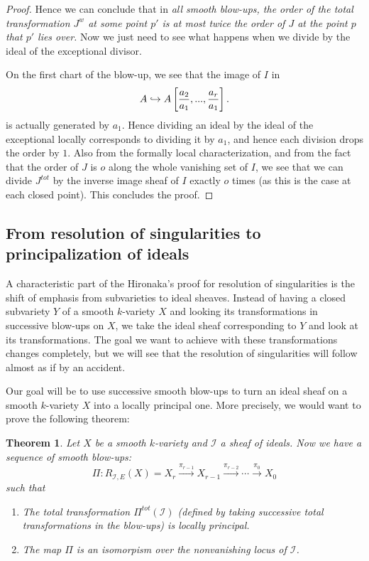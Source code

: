 \documentclass[12pt,a4paper,leqno]{article}
\theoremstyle{plain}
\newtheorem{thm}[theo]{Theorem}
\theoremstyle{definition}
\theoremstyle{remark}
\begin{document}
\begin{proof}
Hence we can conclude that in \emph{all smooth blow-ups, the order of the total transformation $J^w$ at some point $p'$ is at most twice the order of $J$ at the point $p$ that $p'$ lies over.} Now we just need to see what happens when we divide by the ideal of the exceptional divisor.

On the first chart of the blow-up, we see that the image of $I$ in
\begin{equation*}
A \hookrightarrow A \left[ {a_2 \over a_1}, ... , {a_r \over a_1} \right].
\end{equation*}
is actually generated by $a_1$. Hence dividing an ideal by the ideal of the exceptional locally corresponds to dividing it by $a_1$, and hence each division drops the order by $1$. Also from the formally local characterization, and from the fact that the order of $J$ is $o$ along the whole vanishing set of $I$, we see that we can divide $J^{tot}$ by the inverse image sheaf of $I$ exactly $o$ times (as this is the case at each closed point). This concludes the proof.  
\end{proof} 
 
\subsection{From resolution of singularities to principalization of ideals} 

A characteristic part of the Hironaka's proof for resolution of singularities is the shift of emphasis from subvarieties to ideal sheaves. Instead of having a closed subvariety $Y$ of a smooth $k$-variety $X$ and looking its transformations in successive blow-ups on $X$, we take the ideal sheaf corresponding to $Y$ and look at its transformations. The goal we want to achieve with these transformations changes completely, but we will see that the resolution of singularities will follow almost as if by an accident.

Our goal will be to use successive smooth blow-ups to turn an ideal sheaf on a smooth $k$-variety $X$ into a locally principal one. More precisely, we would want to prove the following theorem:

\begin{thm}
Let $X$ be a smooth $k$-variety and $\mathscr{I}$ a sheaf of ideals. Now we have a sequence of smooth blow-ups:
\begin{equation*}
\Pi: R_{\mathscr{I},E} (X) = X_r \stackrel{\pi_{r-1}}{\to} X_{r-1} \stackrel{\pi_{r-2}}{\to} \cdots \stackrel{\pi_{0}}{\to} X_0
\end{equation*}
such that 
\begin{enumerate}
\item The total transformation $\Pi^{tot} (\mathscr{I})$ (defined by taking successive total transformations in the blow-ups) is locally principal.
\item The map $\Pi$ is an isomorpism over the nonvanishing locus of $\mathscr{I}$.
\end{enumerate}
\end{thm} 
\end{document}
